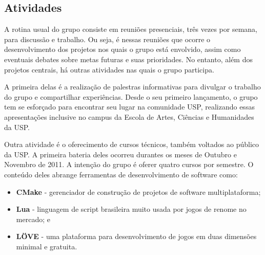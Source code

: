 \documentclass[12pt,onecolumn,a4paper]{article}
\begin{document}
    \subsection{Atividades}
    \label{sec:atividades}
        A rotina usual do grupo consiste em reuniões presenciais, três vezes por semana, para
        discussão e trabalho. Ou seja, é nessas reuniões que ocorre o desenvolvimento dos projetos
        nos quais o grupo está envolvido, assim como eventuais debates sobre metas futuras e suas
        prioridades. No entanto, além dos projetos centrais, há outras atividades nas quais o grupo
        participa.
        
        A primeira delas é a realização de palestras informativas para divulgar o trabalho do grupo
        e compartilhar experiências. Desde o seu primeiro lançamento, o grupo tem se esforçado para
        encontrar seu lugar na comunidade USP, realizando essas apresentações inclusive no campus da
        Escola de Artes, Ciências e Humanidades da USP.
        
        Outra atividade é o oferecimento de cursos técnicos, também voltados ao público da USP. A
        primeira bateria deles ocorreu durantes os meses de Outubro e Novembro de 2011. A intenção
        do grupo é oferer quatro cursos por semestre. O conteúdo deles abrange ferramentas de
        desenvolvimento de software como:

        \begin{itemize}
        
            \item{\bf CMake \footnotemark} - gerenciador de construção de projetos de software
                                             multiplataforma;
            
            \item {\bf Lua \footnotemark} - linguagem de script brasileira muito usada por jogos de
                                            renome no mercado; e

            \item {\bf LÖVE \footnotemark} - uma plataforma para desenvolvimento de jogos em duas
                                             dimensões minimal e gratuita.
            
        \end{itemize}
        
\end{document}
